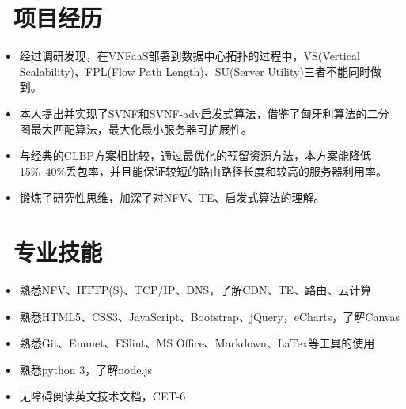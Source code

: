 \documentclass{resume}
\begin{document}
\section{\faUsers\ 项目经历}
\begin{onehalfspacing}
\begin{itemize}
  \item 经过调研发现，在VNFaaS部署到数据中心拓扑的过程中，VS(Vertical Scalability)、FPL(Flow Path Length)、SU(Server Utility)三者不能同时做到。
  \item 本人提出并实现了SVNF和SVNF-adv启发式算法，借鉴了匈牙利算法的二分图最大匹配算法，最大化最小服务器可扩展性。
  \item 与经典的CLBP方案相比较，通过最优化的预留资源方法，本方案能降低15\%~40\%丢包率，并且能保证较短的路由路径长度和较高的服务器利用率。
  \item 锻炼了研究性思维，加深了对NFV、TE、启发式算法的理解。
\end{itemize}
\end{onehalfspacing}


\section{\faCogs\ 专业技能}
\begin{itemize}[parsep=0.5ex]
  \item 熟悉NFV、HTTP(S)、TCP/IP、DNS，了解CDN、TE、路由、云计算
  \item 熟悉HTML5、CSS3、JavaScript、Bootstrap、jQuery，eCharts，了解Canvas
  \item 熟悉Git、Emmet、ESlint、MS Office、Markdown、LaTex等工具的使用
  \item 熟悉python 3，了解node.js
  \item 无障碍阅读英文技术文档，CET-6
\end{itemize}
\end{document}
